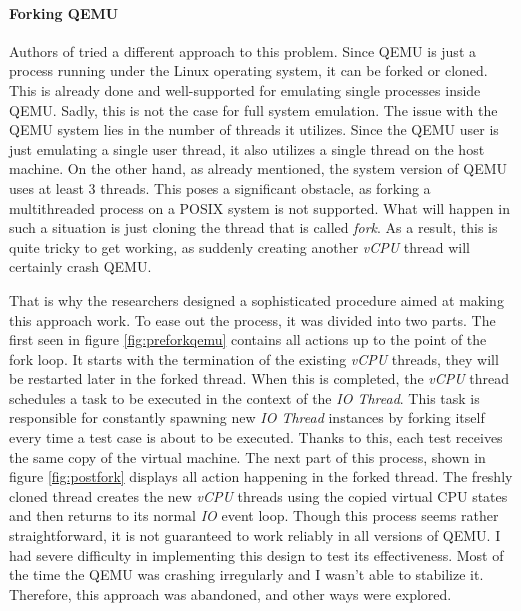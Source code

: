 \paragraph{Forking QEMU}
Authors of \cite{triforceafl} tried a different approach to this problem. Since QEMU is just a process running under the Linux operating system, it can be forked or cloned. This is already done and well-supported for emulating single processes inside QEMU. Sadly, this is not the case for full system emulation. The issue with the QEMU system lies in the number of threads it utilizes. Since the QEMU user is just emulating a single user thread, it also utilizes a single thread on the host machine. On the other hand, as already mentioned, the system version of QEMU uses at least 3 threads. This poses a significant obstacle, as forking a multithreaded process on a POSIX system is not supported. What will happen in such a situation is just cloning the thread that is called \textit{fork}. As a result, this is quite tricky to get working, as suddenly creating another \textit{vCPU} thread will certainly crash QEMU.

That is why the researchers designed a sophisticated procedure aimed at making this approach work. To ease out the process, it was divided into two parts. The first seen in figure \ref{fig:preforkqemu} contains all actions up to the point of the fork loop. It starts with the termination of the existing \textit{vCPU} threads, they will be restarted later in the forked thread. When this is completed, the \textit{vCPU} thread schedules a task to be executed in the context of the \textit{IO Thread}. This task is responsible for constantly spawning new \textit{IO Thread} instances by forking itself every time a test case is about to be executed. Thanks to this, each test receives the same copy of the virtual machine. The next part of this process, shown in figure \ref{fig:postfork} displays all action happening in the forked thread. The freshly cloned thread creates the new \textit{vCPU} threads using the copied virtual CPU states and then returns to its normal \textit{IO} event loop. Though this process seems rather straightforward, it is not guaranteed to work reliably in all versions of QEMU. I had severe difficulty in implementing this design to test its effectiveness. Most of the time the QEMU was crashing irregularly and I wasn't able to stabilize it. Therefore, this approach was abandoned, and other ways were explored.

